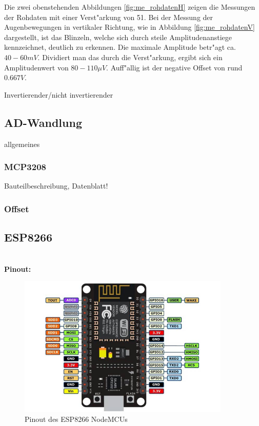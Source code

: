 Die zwei obenstehenden Abbildungen \ref{fig:me_rohdatenH} zeigen die Messungen der Rohdaten mit einer Verst"arkung von 51. Bei der Messung der Augenbewegungen in vertikaler Richtung, wie in Abbildung \ref{fig:me_rohdatenV} dargestellt, ist das Blinzeln, welche sich durch steile Amplitudenanstiege kennzeichnet, deutlich zu erkennen. Die maximale Amplitude betr"agt ca. $40-60 mV$. Dividiert man das durch die Verst"arkung, ergibt sich ein Amplitudenwert von $80-110\mu V$. Auff"allig ist der negative Offset von rund $0.667V$.

Invertierender/nicht invertierender

\subsection {AD-Wandlung} \label {adc}

allgemeines

\subsubsection {MCP3208} \label {mcp3208}

Bauteilbeschreibung, Datenblatt!

\subsubsection {Offset} \label{offset}



\subsection {ESP8266} \label {esp}

\textbf{\\Pinout:\\} 
\begin{figure}[h]
	\centering
		\includegraphics[width=0.9\textwidth]{Alle/ESP8266_Pinout.jpg}
	\caption{Pinout des ESP8266 NodeMCUs}
	\label{fig:esp_pinout}
\end{figure}

